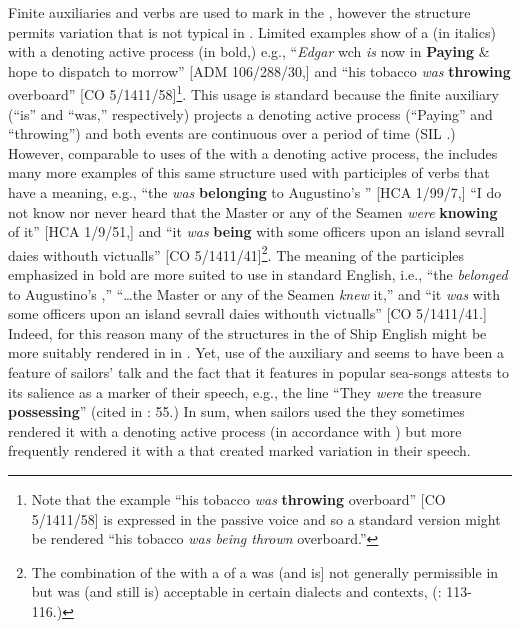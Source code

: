 Finite  auxiliaries and  verbs are used to mark  in the , however the structure permits variation that is not typical in . Limited examples show  of a  (in italics) with a   denoting active process (in bold,) e.g., “\textit{Edgar} wch \textit{is} now in \textbf{Paying} \& hope to dispatch to morrow” [ADM 106/288/30,] and “his tobacco \textit{was} \textbf{throwing} overboard” [CO 5/1411/58]\footnote{Note that the example “his tobacco \textit{was} \textbf{throwing} overboard” [CO 5/1411/58] is expressed in the passive voice and so a standard version might be rendered “his tobacco \textit{was being thrown} overboard.”}. This usage is standard because the finite auxiliary (“is” and “was,” respectively) projects a  denoting active process (“Paying” and “throwing”) and both events are continuous over a period of time (SIL \citealt{International2005}.) However, comparable to uses of the  with a  denoting active process, the  includes many more examples of this same structure used with participles of verbs that have a  meaning, e.g., “the  \textit{was} \textbf{belonging} to Augustino’s ” [HCA 1/99/7,] “I do not know nor never heard that the Master or any of the Seamen \textit{were} \textbf{knowing} of it” [HCA 1/9/51,] and “it \textit{was} \textbf{being} with some officers upon an island sevrall daies withouth victualls” [CO 5/1411/41]\footnote{The combination of the  with a  of a   was (and is] not generally permissible in  but was (and still is) acceptable in certain dialects and contexts, (\citealt{Romer2005}: 113-116.)}. The  meaning of the participles emphasized in bold are more suited to   use in standard English, i.e., “the  \textit{belonged} to Augustino’s ,” “…the Master or any of the Seamen \textit{knew} it,” and “it \textit{was} with some officers upon an island sevrall daies withouth victualls” [CO 5/1411/41.] Indeed, for this reason many of the  structures in the  of Ship English might be more suitably rendered in   in . Yet, use of the  auxiliary and   seems to have been a feature of sailors’ talk and the fact that it features in popular sea-songs attests to its salience as a marker of their speech, e.g., the line “They \textit{were} the treasure \textbf{possessing}” (cited in \citealt{Palmer1986}: 55.) In sum, when sailors used the  they sometimes rendered it with a  denoting active process (in accordance with ) but more frequently rendered it with a   that created marked variation in their speech. 

